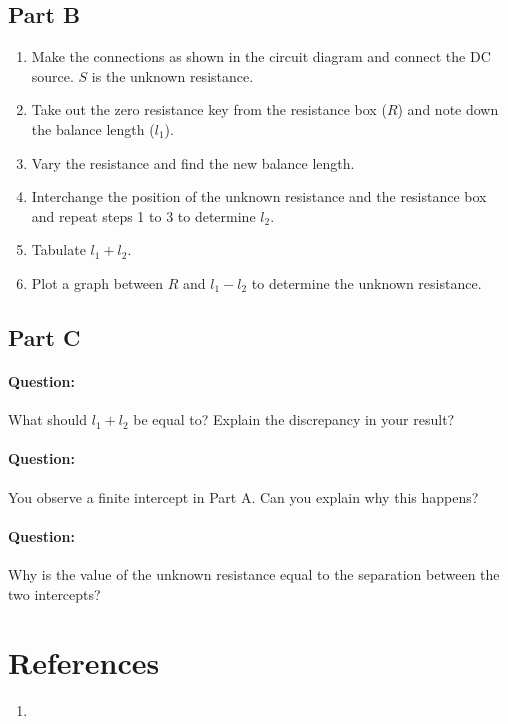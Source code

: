 \subsection*{Part B}

\begin{enumerate}
    \item Make the connections as shown in the circuit diagram and connect the DC source. $S$ is the unknown resistance.
    \item Take out the zero resistance key from the resistance box ($R$) and note down the balance length ($l_1$).
    \item Vary the resistance and find the new balance length.
    \item Interchange the position of the unknown resistance and the resistance box and repeat steps 1 to 3 to determine $l_2$.
    \item Tabulate $l_1 + l_2$.
    \item Plot a graph between $R$ and $l_1 -l_2$ to determine the unknown resistance.
\end{enumerate}

\subsection*{Part C}



\begin{question}
\paragraph{Question:} What should $l_1 + l_2$ be equal to? Explain the discrepancy in your result?~\\
\paragraph{Question:} You observe a finite intercept in Part A. Can you explain why this happens? ~\\ 
\paragraph{Question:} Why is the value of the unknown resistance equal to the separation between the two intercepts?
\end{question}

\section*{References}

\begin{enumerate}
\itemsep0em
\item
\end{enumerate}


\newpage